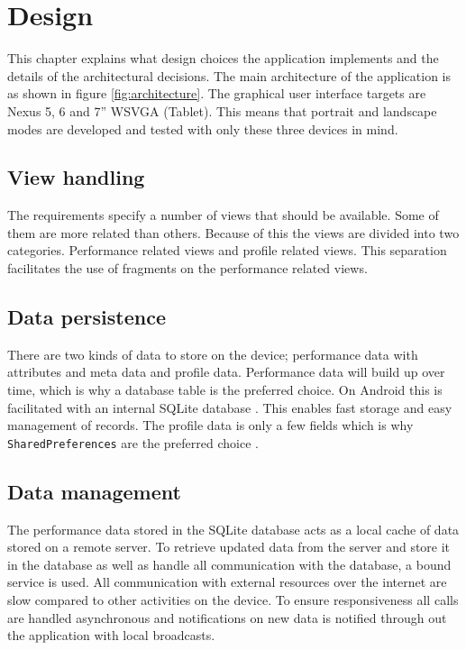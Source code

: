 \chapter{Design}
This chapter explains what design choices the application implements and the details of the architectural decisions. The main architecture of the application is as shown in figure \ref{fig:architecture}. The graphical user interface targets are Nexus 5, 6 and 7'' WSVGA (Tablet). This means that portrait and landscape modes are developed and tested with only these three devices in mind.

\section{View handling}
The requirements specify a number of views that should be available. Some of them are more related than others. Because of this the views are divided into two categories. Performance related views and profile related views. This separation facilitates the use of fragments on the performance related views.

\section{Data persistence}
There are two kinds of data to store on the device; performance data with attributes and meta data and profile data. Performance data will build up over time, which is why a database table is the preferred choice. On Android this is facilitated with an internal SQLite database \citep{android:sqlite}. This enables fast storage and easy management of records. The profile data is only a few fields which is why \verb|SharedPreferences| are the preferred choice \citep{android:sharedprefs}.

\section{Data management}
The performance data stored in the SQLite database acts as a local cache of data stored on a remote server. To retrieve updated data from the server and store it in the database as well as handle all communication with the database, a bound service is used. All communication with external resources over the internet are slow compared to other activities on the device. To ensure responsiveness all calls are handled asynchronous and notifications on new data is notified through out the application with local broadcasts.

